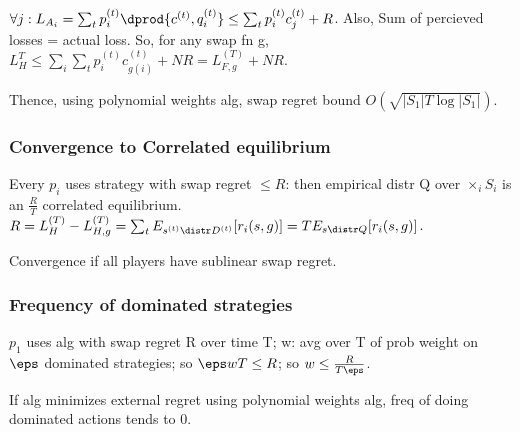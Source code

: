 \documentclass[10pt]{amsart}
\begin{document}
$\forall j: L_{A_{i}} = \sum_{t} p_{i}^{(t)}\dprod{c^{(t)},q_{i}^{(t)}} \leq \sum_{t} p_{i}^{(t)}c_{j}^{(t)} + R$. Also, Sum of percieved losses = actual loss. So, for any swap fn g, $L_{H}^{T}\leq \sum_{i}\sum_{t} p_{i}^{(t)}c_{g(i)}^{(t)} + NR = L_{F,g}^{(T)} + NR$.

Thence, using polynomial weights alg, swap regret bound $O(\sqrt{|S_{1}| T \log |S_{1}|})$.

\subsubsection{Convergence to Correlated equilibrium}
Every $p_{i}$ uses strategy with swap regret $\leq R$: then empirical distr Q over $\times_{i} S_{i}$ is an $\frac{R}{T}$ correlated equilibrium. $R = L_{H}^{(T)} - L_{H,g}^{(T)} = \sum_{t} E_{s^{(t)} \distr D^{(t)}}[r_{i}(s,g)] = T E_{s \distr Q}[r_{i}(s,g)]$.

Convergence if all players have sublinear swap regret.

\subsubsection{Frequency of dominated strategies}
$p_{1}$ uses alg with swap regret R over time T; w: avg over T of prob weight on $\eps$ dominated strategies; so $\eps wT \leq R$; so $w \leq \frac{R}{T\eps}$.

If alg minimizes external regret using polynomial weights alg, freq of doing dominated actions tends to 0.



\end{document}

